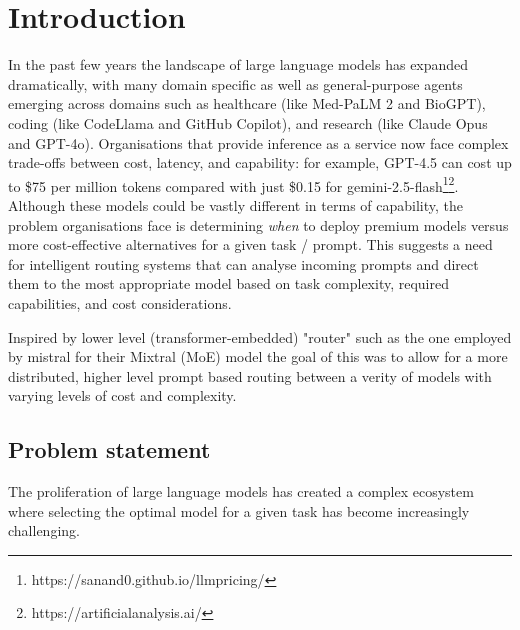 \chapter{Introduction}
\label{ch:into}

In the past few years the landscape of large language models has expanded dramatically, with many domain specific as well as general-purpose agents emerging across domains such as healthcare (like Med-PaLM 2 and BioGPT), coding (like CodeLlama and GitHub Copilot), and research (like Claude Opus and GPT-4o). Organisations that provide inference as a service now face complex trade-offs between cost, latency, and capability: for example, GPT-4.5 can cost up to \$75 per million tokens compared with just \$0.15 for gemini-2.5-flash\footnote{https://sanand0.github.io/llmpricing/}\footnote{https://artificialanalysis.ai/}. Although these models could be vastly different in terms of capability, the problem organisations face is determining \textit{when} to deploy premium models versus more cost-effective alternatives for a given task / prompt. This suggests a need for intelligent routing systems that can analyse incoming prompts and direct them to the most appropriate model based on task complexity, required capabilities, and cost considerations.

Inspired by lower level (transformer-embedded) "router" such as the one employed by mistral for their Mixtral (MoE) model the goal of this was to allow for a more distributed, higher level prompt based routing between a verity of models with varying levels of cost and complexity.

\section{Problem statement}
\label{sec:intro_prob_art}

The proliferation of large language models has created a complex ecosystem where selecting the optimal model for a given task has become increasingly challenging.

